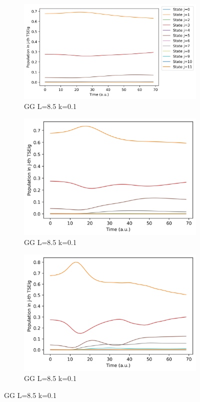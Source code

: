 \documentclass[11pt, a4paper]{article} %
\begin{document}
\begin{figure}[p]
  \begin{subfigure}[b]{0.36\linewidth}
    \includegraphics[width=\linewidth]{Population_GG_L8.5_k0_0.1.png}
    \caption{GG L=8.5 k=0.1}
  \end{subfigure}
    \begin{subfigure}[b]{0.30\linewidth}
    \includegraphics[width=\linewidth]{Population_GG_L8.5_k0_0.5.png}
    \caption{GG L=8.5 k=0.1}
  \end{subfigure}  
  \begin{subfigure}[b]{0.30\linewidth}
    \includegraphics[width=\linewidth]{Population_GG_L8.5_k0_1.0.png}
    \caption{GG L=8.5 k=0.1}
  \end{subfigure}
  

\end{figure}
\end{document}
